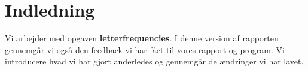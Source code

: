 \documentclass[class=report, crop=false]{standalone}
\begin{document}
    \section*{Indledning}
    Vi arbejder med opgaven \textbf{letterfrequencies}. I denne version af rapporten gennemgår vi også den feedback vi har fået til vores rapport og program. Vi introducere hvad vi har gjort anderledes og gennemgår de ændringer vi har lavet.
\end{document}

